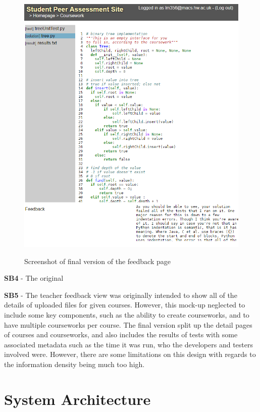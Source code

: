 \documentclass[a4paper,11pt]{report}
\begin{document}
\begin{figure}[ht]
\includegraphics[width=\textwidth]{storyboard/final-feedback.png}
\label{fig:final-fb}
\caption{Screenshot of final version of the feedback page}
\end{figure}
\textbf{SB4} - The original \par
\textbf{SB5} - The teacher feedback view was originally intended to show all of the details of uploaded files for given courses. However, this mock-up neglected to include some key components, such as the ability to create courseworks, and to have multiple courseworks per course. The final version split up the detail pages of courses and courseworks, and also includes the results of tests with some associated metadata such as the time it was run, who the developers and testers involved were. However, there are some limitations on this design with regards to the information density being much too high.\par

\section{System Architecture}
\end{document}
